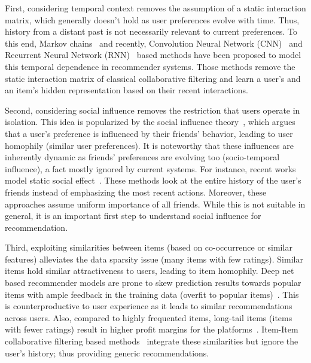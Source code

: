 First, considering temporal context removes the assumption of a static interaction matrix, which generally doesn't hold as user preferences evolve with time. Thus, history from a distant past is not necessarily relevant to current preferences.
To this end, Markov chains~\cite{Rendle2} and recently, Convolution Neural Network (CNN)~\cite{SAS:2018} and Recurrent Neural Network (RNN)~\cite{GRU4Rec} based methods have been proposed to model this temporal dependence in recommender systems.
Those methods remove the static interaction matrix of classical collaborative filtering and learn a user's and an item's hidden representation based on their recent interactions.

Second, considering social influence removes the restriction that users operate in isolation. This idea is popularized by the social influence theory~\cite{Tang:2009}, which argues that a user's preference is influenced by their friends' behavior, leading to user homophily (similar user preferences). It is noteworthy that these influences are inherently dynamic as friends' preferences are evolving too (socio-temporal influence), a fact mostly ignored by current systems.
For instance, recent works model static social effect~\cite{SBPR, Collaborative, SERec, fan2019}. These methods look at the entire history of the user's friends instead of emphasizing the most recent actions. Moreover, these approaches assume uniform importance of all friends. While this is not suitable in general, it is an important first step to understand social influence for  recommendation.

Third, exploiting similarities between items (based on co-occurrence or similar features)  alleviates the data sparsity issue %
(many items with few ratings). Similar items hold similar attractiveness to users, leading to item homophily. Deep net based recommender models are prone to skew prediction results towards popular items with ample feedback in the training data (overfit to popular items)~\cite{ Longtail:2018}. This is counterproductive to user experience as it leads to similar recommendations across users. Also, compared to highly frequented items, long-tail items (items with fewer ratings) result in higher profit margins for the platforms~\cite{Yin:2012}. Item-Item collaborative filtering based methods~\cite{itemCF} integrate these similarities but ignore the user's history; thus providing generic recommendations.

